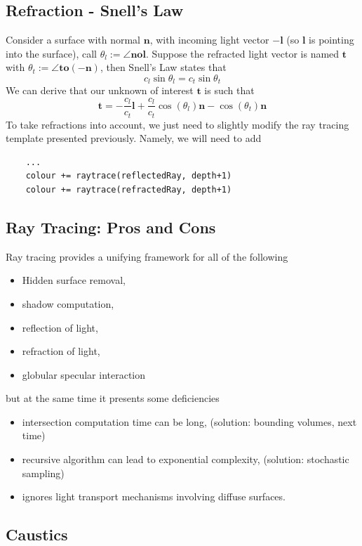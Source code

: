 \documentclass[11pt]{article}
\newcommand{\bl}{\mathbf{l}}
\newcommand{\bn}{\mathbf{n}}
\newcommand{\bo}{\mathbf{o}}
\newcommand{\bt}{\mathbf{t}}
\begin{document}
\subsection{Refraction - Snell's Law}
Consider a surface with normal $\bn$, with incoming light vector $-\bl$ (so $\bl$ is pointing into the surface), call $\theta_l := \angle\bn\bo\bl$. Suppose the refracted light vector is named $\bt$ with $\theta_t:= \angle \bt\bo (-\bn )$, then Snell's Law states that
\begin{equation}
	c_l \sin\theta_l = c_t \sin \theta_t
\end{equation}
We can derive that our unknown of interest $\bt$ is such that 
\begin{equation}
	\bt = -\frac{c_l}{c_t}\bl + \frac{c_l}{c_t} \cos(\theta_l) \bn - \cos (\theta_t ) \bn
\end{equation}
To take refractions into account, we just need to slightly modify the ray tracing template presented previously. Namely, we will need to add 
\begin{verbatim}
	...
	colour += raytrace(reflectedRay, depth+1)
	colour += raytrace(refractedRay, depth+1)
\end{verbatim}

\subsection{Ray Tracing: Pros and Cons}
Ray tracing provides a unifying framework for all of the following
\begin{itemize}
	\item Hidden surface removal, 
	\item shadow computation, 
	\item reflection of light, 
	\item refraction of light, 
	\item globular specular interaction 
\end{itemize}
but at the same time it presents some deficiencies
\begin{itemize}
	\item intersection computation time can be long, (solution: bounding volumes, next time)
	\item recursive algorithm can lead to exponential complexity, (solution: stochastic sampling)
	\item ignores light transport mechanisms involving diffuse surfaces. 
\end{itemize}

\subsection{Caustics}
\end{document}
